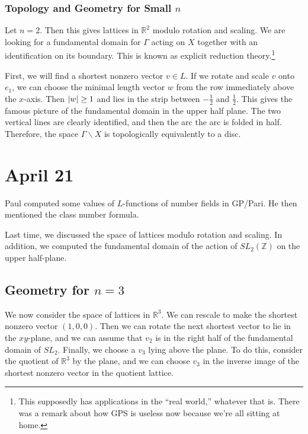 \documentclass[leqno, openany]{memoir}
\theoremstyle{definition}
\theoremstyle{remark}
\theoremstyle{plain}
\theoremstyle{definition}
\theoremstyle{remark}
\newcommand{\R}{\mathbb{R}}
\newcommand{\Z}{\mathbb{Z}}
\begin{document}
\subsection{Topology and Geometry for Small $n$}%
\label{sub:topology_and_geometry_for_small_n_}

Let $n = 2$. Then this gives lattices in $\R^2$ modulo rotation and scaling. We are looking for a fundamental domain for $\Gamma$ acting on $X$ together with an identification on its boundary. This is known as explicit reduction theory.\footnote{This supposedly has applications in the ``real world,'' whatever that is. There was a remark about how GPS is useless now because we're all sitting at home.}

First, we will find a shortest nonzero vector $v \in L$. If we rotate and scale $v$ onto $e_1$, we can choose the minimal length vector $w$ from the row immediately above the $x$-axis. Then $\abs{w} \geq 1$ and lies in the strip between $-\frac{1}{2}$ and $\frac{1}{2}$. This gives the famous picture of the fundamental domain in the upper half plane. The two vertical lines are clearly identified, and then the arc the arc is folded in half. Therefore, the space $\Gamma \backslash X$ is topologically equivalently to a disc.


\chapter{April 21}%
\label{cha:april_21}

Paul computed some values of $L$-functions of number fields in GP/Pari. He then mentioned the class number formula.

Last time, we discussed the space of lattices modulo rotation and scaling. In addition, we computed the fundamental domain of the action of $SL_2(\Z)$ on the upper half-plane.

\section{Geometry for $n=3$}%
\label{sec:geometry_for_n_3_}


We now consider the space of lattices in $\R^3$. We can rescale to make the shortest nonzero vector $(1,0,0)$. Then we can rotate the next shortest vector to lie in the $xy$-plane, and we can assume that $v_2$ is in the right half of the fundamental domain of $SL_2$. Finally, we choose a $v_3$ lying above the plane. To do this, consider the quotient of $\R^3$ by the plane, and we can choose $v_3$ in the inverse image of the shortest nonzero vector in the quotient lattice.
\end{document}
